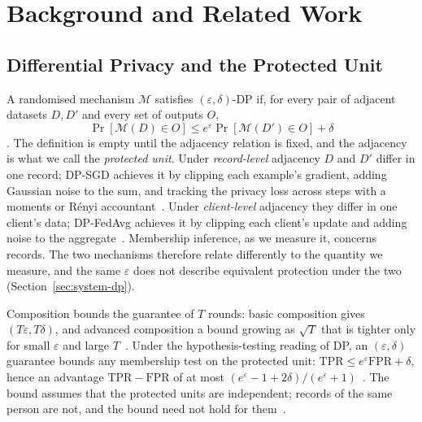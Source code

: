
\section{Background and Related Work}
\label{sec:background}

\subsection{Differential Privacy and the Protected Unit}
\label{sec:bg-dp}

A randomised mechanism $\mathcal{M}$ satisfies $(\varepsilon,\delta)$-DP if,
for every pair of adjacent datasets $D, D'$ and every set of outputs $O$,
\begin{equation}
\Pr[\mathcal{M}(D) \in O] \le e^{\varepsilon} \Pr[\mathcal{M}(D') \in O] + \delta
\label{eq:dp}
\end{equation}
\cite{dwork2006calibrating,dwork2014algorithmic}. The definition is empty until
the adjacency relation is fixed, and the adjacency is what we call the
\emph{protected unit}. Under \emph{record-level} adjacency $D$ and $D'$ differ
in one record; DP-SGD achieves it by clipping each example's gradient, adding
Gaussian noise to the sum, and tracking the privacy loss across steps with a
moments or R\'enyi accountant~\cite{abadi2016deep,mironov2017renyi}. Under
\emph{client-level} adjacency they differ in one client's data; DP-FedAvg
achieves it by clipping each client's update and adding noise to the
aggregate~\cite{mcmahan2018learning}. Membership inference, as we measure it,
concerns records. The two mechanisms therefore relate differently to the
quantity we measure, and the same $\varepsilon$ does not describe equivalent
protection under the two (Section~\ref{sec:system-dp}).

Composition bounds the guarantee of $T$ rounds: basic composition gives
$(T\varepsilon, T\delta)$, and advanced composition a bound growing as
$\sqrt{T}$ that is tighter only for small $\varepsilon$ and large
$T$~\cite{dwork2014algorithmic}. Under the hypothesis-testing reading of DP,
an $(\varepsilon,\delta)$ guarantee bounds any membership test on the
protected unit: $\mathrm{TPR} \le e^{\varepsilon}\mathrm{FPR} + \delta$, hence
an advantage $\mathrm{TPR} - \mathrm{FPR}$ of at most
$(e^{\varepsilon} - 1 + 2\delta)/(e^{\varepsilon} + 1)$~\cite{kairouz2015composition}.
The bound assumes that the protected units are independent; records of the
same person are not, and the bound need not hold for
them~\cite{humphries2020differentially}.

